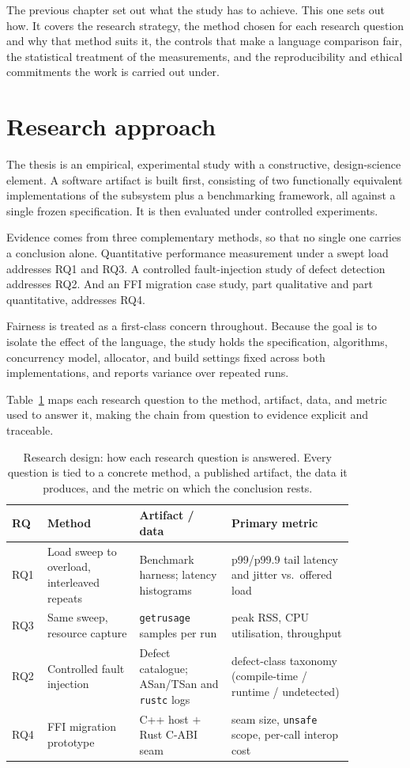 \documentclass[english,twoside,openright,a4paper,censored,csm,software-track-2020]{HYthesisML}
\begin{document}
The previous chapter set out what the study has to achieve. This one sets out how. It covers the
research strategy, the method chosen for each research question and why that method suits it, the
controls that make a language comparison fair, the statistical treatment of the measurements, and
the reproducibility and ethical commitments the work is carried out under.

\section{Research approach}
The thesis is an empirical, experimental study with a constructive, design-science element. A
software artifact is built first, consisting of two functionally equivalent implementations of the
subsystem plus a benchmarking framework, all against a single frozen specification. It is then
evaluated under controlled experiments.

Evidence comes from three complementary methods, so that no single one carries a conclusion alone.
Quantitative performance measurement under a swept load addresses RQ1 and RQ3. A controlled
fault-injection study of defect detection addresses RQ2. And an FFI migration case study, part
qualitative and part quantitative, addresses RQ4.

Fairness is treated as a first-class concern throughout. Because the goal is to isolate the effect
of the language, the study holds the specification, algorithms, concurrency model, allocator, and
build settings fixed across both implementations, and reports variance over repeated runs.

Table~\ref{tab:design} maps each research question to the method, artifact, data, and metric
used to answer it, making the chain from question to evidence explicit and traceable.

\begin{table}
\centering
\caption[Research design: how each research question is answered]{Research design: how each research question is answered. Every question is tied to a
concrete method, a published artifact, the data it produces, and the metric on which the
conclusion rests.\label{tab:design}}
\renewcommand{\arraystretch}{1.25}
\begin{tabular}{@{}p{0.06\linewidth} p{0.24\linewidth} p{0.24\linewidth} p{0.32\linewidth}@{}}
\hline\hline
RQ & Method & Artifact / data & Primary metric \\
\hline
RQ1 & Load sweep to overload, interleaved repeats & Benchmark harness; latency histograms &
p99/p99.9 tail latency and jitter vs.\ offered load \\
RQ3 & Same sweep, resource capture & \texttt{getrusage} samples per run &
peak RSS, CPU utilisation, throughput \\
RQ2 & Controlled fault injection & Defect catalogue; ASan/TSan and \texttt{rustc} logs &
defect-class taxonomy (compile-time / runtime / undetected) \\
RQ4 & FFI migration prototype & C++ host $+$ Rust C-ABI seam &
seam size, \texttt{unsafe} scope, per-call interop cost \\
\hline
\end{tabular}
\end{table}
\end{document}
